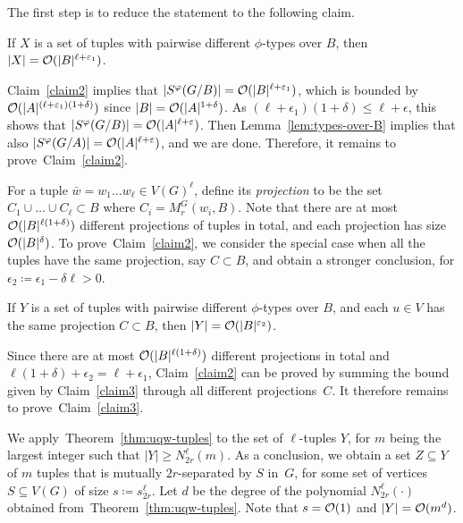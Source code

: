 	\setcounter{claim}{0}
	
The first step is to reduce the statement to the following claim.

\begin{claim}\label{claim2}
If $X$ is a set of tuples with pairwise different $\phi$-types over $B$, then $|X|=\mathcal{O}(|B|^{\ell+\varepsilon_1})$.
\end{claim}	

Claim~\ref{claim2} implies that $|S^\varphi(G/B)|=\mathcal{O}(|B|^{\ell+\varepsilon_1})$, 
which is bounded by $\mathcal{O}(|A|^{(\ell+\varepsilon_1)(1+\delta)})$ since $|B|=\mathcal{O}(|A|^{1+\delta})$. As $(\ell+\epsilon_1)(1+\delta)\le \ell+\epsilon$, this shows that $|S^\varphi(G/B)|=\mathcal{O}(|A|^{\ell+\varepsilon})$.
Then Lemma~\ref{lem:types-over-B} implies that also $|S^\varphi(G/A)|=\mathcal{O}(|A|^{\ell+\varepsilon})$, and we are done. Therefore, it remains to prove~Claim~\ref{claim2}.

\medskip

For a tuple $\bar w=w_1\ldots w_\ell\in V(G)^\ell$, define its \emph{projection}
to be the set $C_1\cup\ldots\cup C_\ell\subset B$ where  
$C_i=M^G_r(w_i, B)$. Note that there are at most 
$\mathcal{O}(|B|^{\ell(1+\delta)})$ different projections of tuples in total, and each projection has size $\mathcal{O}(|B|^\delta)$.
To prove~Claim~\ref{claim2}, we consider the special case when all the tuples have the same projection, say $C\subset B$, and  obtain a stronger conclusion,
for $\epsilon_2\coloneqq \epsilon_1-\delta\ell>0$.

\begin{claim}\label{claim3}
If $Y$ is a set of tuples with pairwise different $\phi$-types over $B$, and each $u\in V$ has the same projection $C\subset B$, then $|Y|=\mathcal{O}(|B|^{\varepsilon_2})$.
\end{claim}

Since there are at most $\mathcal{O}(|B|^{\ell(1+\delta)})$ different projections in total and $\ell(1+\delta)+\epsilon_2=\ell+\epsilon_1$, Claim~\ref{claim2} can be proved
by summing the bound given by Claim~\ref{claim3} through all different projections~$C$.
It therefore remains to prove~Claim~\ref{claim3}.

\medskip

We apply~Theorem~\ref{thm:uqw-tuples} to the set of $\ell$-tuples $Y$, for $m$ being the largest integer such that $|Y|\ge N^{\ell}_{2r}(m)$.
  As a conclusion, we obtain a set $Z\subseteq Y$ of $m$ tuples that is mutually $2r$-separated by $S$ in~$G$, for some set of vertices $S\subseteq V(G)$ of size $s\coloneqq s^{\ell}_{2r}$.
  Let $d$ be the degree of the polynomial $N^\ell_{2r}(\cdot)$ obtained from~Theorem~\ref{thm:uqw-tuples}.
  Note that $s=\mathcal{O}(1)$ and $|Y|=\mathcal{O}(m^d)$.
    
